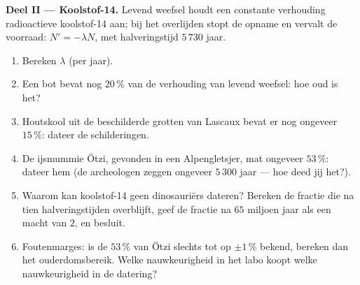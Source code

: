 \begin{problem}
\medskip
\noindent\textbf{Deel II --- Koolstof-14.}
Levend weefsel houdt een constante verhouding radioactieve koolstof-14 aan;
bij het overlijden stopt de opname en vervalt de voorraad:
$N' = -\lambda N$, met halveringstijd $5\,730$ jaar.
\begin{enumerate}[resume]
  \item Bereken $\lambda$ (per jaar).
  \item Een bot bevat nog $20\,\%$ van de verhouding van levend weefsel: hoe
        oud is het?
  \item Houtskool uit de beschilderde grotten van Lascaux bevat er nog
        ongeveer $15\,\%$: dateer de schilderingen.
  \item De ijsmummie Ötzi, gevonden in een Alpengletsjer, mat ongeveer
        $53\,\%$: dateer hem (de archeologen zeggen ongeveer $5\,300$ jaar
        --- hoe deed jij het?).
  \item Waarom kan koolstof-14 geen dinosauriërs dateren? Bereken de fractie
        die na tien halveringstijden overblijft, geef de fractie na $65$
        miljoen jaar als een macht van $2$, en besluit.
  \item Foutenmarges: is de $53\,\%$ van Ötzi slechts tot op $\pm 1\,\%$
        bekend, bereken dan het ouderdomsbereik. Welke nauwkeurigheid in het
        labo koopt welke nauwkeurigheid in de datering?
\end{enumerate}


\end{problem}
